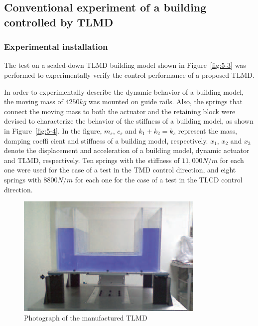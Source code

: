 
\subsection{Conventional experiment of a building controlled by TLMD}

\subsubsection{Experimental installation}

The test on a scaled-down TLMD building model shown in Figure~\ref{fig:5-3} was performed to experimentally verify the control performance of a proposed TLMD.

In order to experimentally describe the dynamic behavior of a building model, the moving mass of $4250 kg$ was mounted on guide rails. Also, the springs that connect the moving mass to both the actuator and the retaining block were devised to characterize the behavior of the stiffness of a building model, as shown in Figure~\ref{fig:5-4}. In the figure, $m_{s}$, $c_{s}$ and $k_{1} + k_{2} = k_{s}$ represent the mass, damping coeffi cient and stiffness of a building model, respectively. $x_{1}$, $x_{2}$ and $x_{3}$ denote the displacement and acceleration of a building model, dynamic actuator and TLMD, respectively. Ten springs with the stiffness of $11,000 N/m$ for each one were used for the case of a test in the TMD control direction, and eight springs with $8800 N/m$ for each one for the case of a test in the TLCD control direction.

\begin{figure}[ht]
\centering
\includegraphics[width=0.8\textwidth] {figure/5-2.eps}
\caption{Photograph of the manufactured TLMD}
\label{fig:5-2}
\end{figure}

